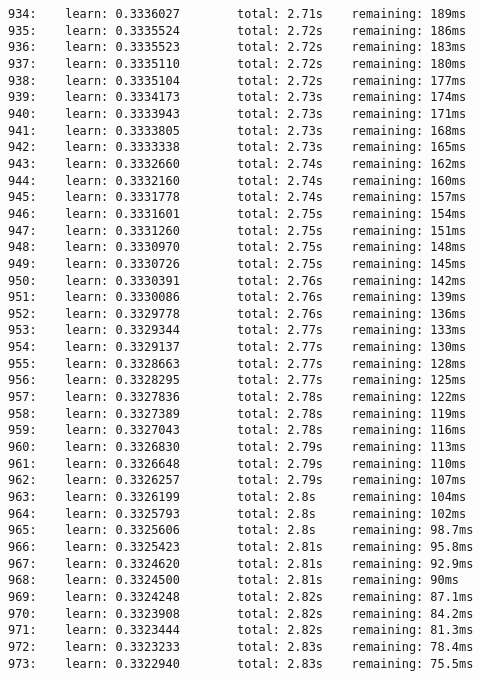 \documentclass[11pt]{article}
\begin{document}
\begin{Verbatim}[commandchars=\\\{\}]
934:    learn: 0.3336027        total: 2.71s    remaining: 189ms
935:    learn: 0.3335524        total: 2.72s    remaining: 186ms
936:    learn: 0.3335523        total: 2.72s    remaining: 183ms
937:    learn: 0.3335110        total: 2.72s    remaining: 180ms
938:    learn: 0.3335104        total: 2.72s    remaining: 177ms
939:    learn: 0.3334173        total: 2.73s    remaining: 174ms
940:    learn: 0.3333943        total: 2.73s    remaining: 171ms
941:    learn: 0.3333805        total: 2.73s    remaining: 168ms
942:    learn: 0.3333338        total: 2.73s    remaining: 165ms
943:    learn: 0.3332660        total: 2.74s    remaining: 162ms
944:    learn: 0.3332160        total: 2.74s    remaining: 160ms
945:    learn: 0.3331778        total: 2.74s    remaining: 157ms
946:    learn: 0.3331601        total: 2.75s    remaining: 154ms
947:    learn: 0.3331260        total: 2.75s    remaining: 151ms
948:    learn: 0.3330970        total: 2.75s    remaining: 148ms
949:    learn: 0.3330726        total: 2.75s    remaining: 145ms
950:    learn: 0.3330391        total: 2.76s    remaining: 142ms
951:    learn: 0.3330086        total: 2.76s    remaining: 139ms
952:    learn: 0.3329778        total: 2.76s    remaining: 136ms
953:    learn: 0.3329344        total: 2.77s    remaining: 133ms
954:    learn: 0.3329137        total: 2.77s    remaining: 130ms
955:    learn: 0.3328663        total: 2.77s    remaining: 128ms
956:    learn: 0.3328295        total: 2.77s    remaining: 125ms
957:    learn: 0.3327836        total: 2.78s    remaining: 122ms
958:    learn: 0.3327389        total: 2.78s    remaining: 119ms
959:    learn: 0.3327043        total: 2.78s    remaining: 116ms
960:    learn: 0.3326830        total: 2.79s    remaining: 113ms
961:    learn: 0.3326648        total: 2.79s    remaining: 110ms
962:    learn: 0.3326257        total: 2.79s    remaining: 107ms
963:    learn: 0.3326199        total: 2.8s     remaining: 104ms
964:    learn: 0.3325793        total: 2.8s     remaining: 102ms
965:    learn: 0.3325606        total: 2.8s     remaining: 98.7ms
966:    learn: 0.3325423        total: 2.81s    remaining: 95.8ms
967:    learn: 0.3324620        total: 2.81s    remaining: 92.9ms
968:    learn: 0.3324500        total: 2.81s    remaining: 90ms
969:    learn: 0.3324248        total: 2.82s    remaining: 87.1ms
970:    learn: 0.3323908        total: 2.82s    remaining: 84.2ms
971:    learn: 0.3323444        total: 2.82s    remaining: 81.3ms
972:    learn: 0.3323233        total: 2.83s    remaining: 78.4ms
973:    learn: 0.3322940        total: 2.83s    remaining: 75.5ms

\end{Verbatim}
\end{document}
